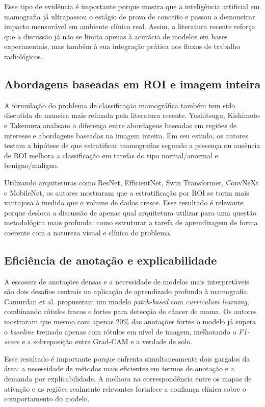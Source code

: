Esse tipo de evidência é importante porque mostra que a inteligência artificial em mamografia já ultrapassou o estágio de prova de conceito e passou a demonstrar impacto mensurável em ambiente clínico real. Assim, a literatura recente reforça que a discussão já não se limita apenas à acurácia de modelos em bases experimentais, mas também à sua integração prática nos fluxos de trabalho radiológicos.

\subsection{Abordagens baseadas em ROI e imagem inteira}

A formulação do problema de classificação mamográfica também tem sido discutida de maneira mais refinada pela literatura recente. Yoshitsugu, Kishimoto e Takemura \cite{yoshitsugu2026} analisam a diferença entre abordagens baseadas em regiões de interesse e abordagens baseadas na imagem inteira. Em seu estudo, os autores testam a hipótese de que estratificar mamografias segundo a presença ou ausência de ROI melhora a classificação em tarefas do tipo normal/anormal e benigno/maligno.

Utilizando arquiteturas como ResNet, EfficientNet, Swin Transformer, ConvNeXt e MobileNet, os autores mostraram que a estratificação por ROI se torna mais vantajosa à medida que o volume de dados cresce. Esse resultado é relevante porque desloca a discussão de apenas qual arquitetura utilizar para uma questão metodológica mais profunda: como estruturar a tarefa de aprendizagem de forma coerente com a natureza visual e clínica do problema.

\subsection{Eficiência de anotação e explicabilidade}

A escassez de anotações densas e a necessidade de modelos mais interpretáveis são dois desafios centrais na aplicação de aprendizado profundo à mamografia. Camurdan et al. \cite{camurdan2025} propuseram um modelo \textit{patch-based} com \textit{curriculum learning}, combinando rótulos fracos e fortes para detecção de câncer de mama. Os autores mostraram que mesmo com apenas 20\% das anotações fortes o modelo já supera o \textit{baseline} treinado apenas com rótulos em nível de imagem, melhorando o \textit{F1-score} e a sobreposição entre Grad-CAM e a verdade de solo.

Esse resultado é importante porque enfrenta simultaneamente dois gargalos da área: a necessidade de métodos mais eficientes em termos de anotação e a demanda por explicabilidade. A melhora na correspondência entre os mapas de ativação e as regiões realmente relevantes fortalece a confiança clínica sobre o comportamento do modelo.

